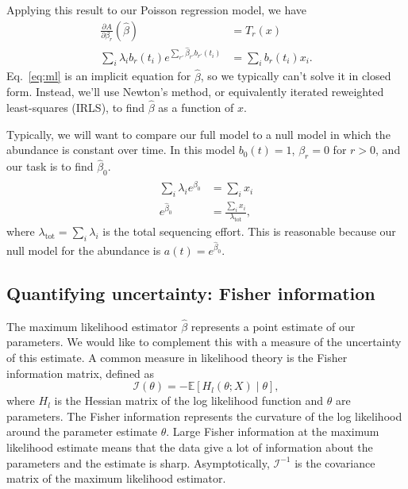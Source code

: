 \documentclass[12pt, letterpaper]{article}
\newcommand{ \lambtot }{\lambda_{\text{tot}}}
\begin{document}
Applying this result to our Poisson regression model, we have
\begin{align}
    \frac{\partial A}{\partial \beta_r}(\hat{\beta}) &= T_r(x) \\
    \sum_i \lambda_i b_r(t_i) e^{\sum_{r'} \hat{\beta}_{r'} b_{r'}(t_i)}
                                                     &= \sum_i b_r(t_i) x_i.
    \label{eq:ml}
\end{align}
Eq.~\ref{eq:ml} is an implicit equation for $\hat{\beta}$, so we typically can't solve it in closed form.
Instead, we'll use Newton's method, or equivalently iterated reweighted least-squares (IRLS), to find $\hat{\beta}$ as a function of $x$.

Typically, we will want to compare our full model to a null model in which the abundance is constant over time.
In this model $b_0(t) = 1$, $\beta_r = 0$ for $r > 0$, and our task is to find $\hat{\beta}_0$.
\begin{align}
    \sum_i \lambda_i e^{\hat{\beta}_0} &= \sum_i x_i \\
    e^{\hat{\beta}_0} &= \frac{\sum_i x_i}{\lambtot},
\end{align}
where $\lambtot = \sum_i \lambda_i$ is the total sequencing effort.
This is reasonable because our null model for the abundance is $a(t) = e^{\hat{\beta}_0}$.

\subsection{Quantifying uncertainty: Fisher information}
The maximum likelihood estimator $\hat{\beta}$ represents a point estimate of our parameters.
We would like to complement this with a measure of the uncertainty of this estimate.
A common measure in likelihood theory is the Fisher information matrix, defined as
\begin{equation}
    \mathcal{I}(\theta) = - \mathbb{E}\left[H_{l}(\theta; X) \middle| \theta \right],
\end{equation}
where $H_l$ is the Hessian matrix of the log likelihood function and $\theta$ are parameters.
The Fisher information represents the curvature of the log likelihood around the parameter estimate $\theta$.
Large Fisher information at the maximum likelihood estimate means that the data give a lot of information about the parameters and the estimate is sharp.
Asymptotically, $\mathcal{I}^{-1}$ is the covariance matrix of the maximum likelihood estimator.
\end{document}
